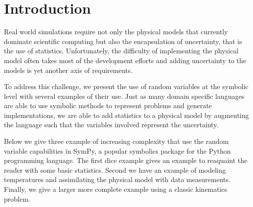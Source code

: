 \section{Introduction}

Real world simulations require not only the physical models that currently
dominate scientific computing but also the encapsulation of uncertainty, that
is the use of statistics.  Unfortunately, the difficulty of implementing the
physical model often takes most of the development efforts and adding
uncertainty to the models is yet another axis of requirements.

To address this challenge, we present the use of random variables at the
symbolic level with several examples of their use.  Just as many domain
specific languages are able to use symbolic methods to represent problems and
generate implementations, we are able to add statistics to a physical model by
augmenting the language such that the variables involved represent the
uncertainty.

Below we give three example of increasing complexity that use the random
variable capabilities in SymPy, a popular symbolics package for the Python
programming language.  The first dice example gives an example to reaquaint the
reader with some basic statistics.  Second we have an example of modeling
temperatures and assimilating the physical model with data
measurements. Finally, we give a larger more complete example using a classic
kinematics problem.

